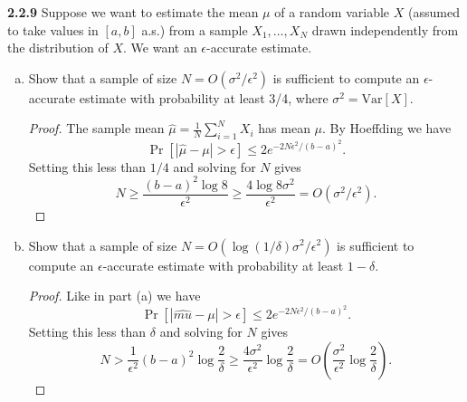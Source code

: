 \documentclass[11pt,letterpaper]{report}
\newcommand{\Var}{\text{Var}}
\begin{document}
\noindent\textbf{2.2.9}
Suppose we want to estimate the mean $\mu$ of a random variable $X$ (assumed to take values in $[a,b]$ a.s.) from a sample $X_1, \ldots, X_N$ drawn independently from the distribution of $X$. We want an $\epsilon$-accurate estimate.
\begin{enumerate}[(a)]
	\item Show that a sample of size $N = O(\sigma^2/\epsilon^2)$ is sufficient to compute an $\epsilon$-accurate estimate with probability at least 3/4, where $\sigma^2 = \Var[X]$.
	\begin{proof}
		The sample mean $\hat{\mu} = \frac{1}{N}\sum_{i=1}^NX_i$ has mean $\mu$. By Hoeffding we have
		\[
		\Pr[|\hat{\mu}-\mu|>\epsilon] \leq 2e^{-2N\epsilon^2/(b-a)^2}.
		\]
		Setting this less than $1/4$ and solving for $N$ gives
		\[
		N\geq \frac{(b-a)^2\log 8}{\epsilon^2} \geq \frac{4\log 8\sigma^2}{\epsilon^2} = O(\sigma^2/\epsilon^2).
		\]

	\end{proof}

	\item Show that a sample of size $N = O(\log(1/\delta)\sigma^2/\epsilon^2)$ is sufficient to compute an $\epsilon$-accurate estimate with probability at least $1-\delta$.
	\begin{proof}
		Like in part (a) we have
		\[
		\Pr[|\hat{mu}-\mu|>\epsilon]\leq 2e^{-2N\epsilon^2/(b-a)^2}.
		\]
		Setting this less than $\delta$ and solving for $N$ gives
		\[
		N > \frac{1}{\epsilon^2}(b-a)^2\log\frac{2}{\delta} \geq \frac{4\sigma^2}{\epsilon^2}\log\frac{2}{\delta} = O\left(\frac{\sigma^2}{\epsilon^2}\log\frac{2}{\delta}\right).
		\]
	\end{proof}
\end{enumerate}
\end{document}

